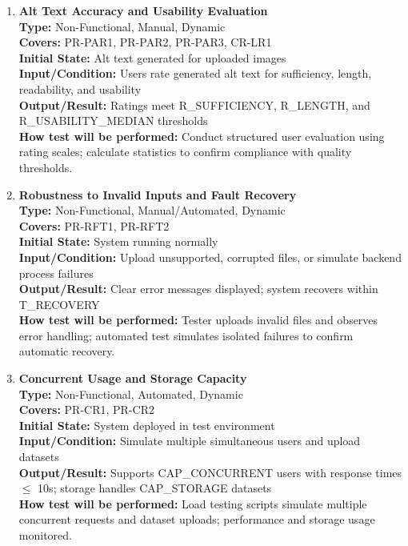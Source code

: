\documentclass[12pt, titlepage]{article}
\begin{document}
\begin{enumerate}[label=NFR-ST \arabic*., wide=0pt, leftmargin=*]
  \item \textbf{Alt Text Accuracy and Usability Evaluation} \\[2mm]
    \textbf{Type:} Non-Functional, Manual, Dynamic \\
    \textbf{Covers:} PR-PAR1, PR-PAR2, PR-PAR3, CR-LR1 \\
    \textbf{Initial State:} Alt text generated for uploaded images \\
    \textbf{Input/Condition:} Users rate generated alt text for
    sufficiency, length, readability, and usability \\
    \textbf{Output/Result:} Ratings meet R\_SUFFICIENCY, R\_LENGTH, and
    R\_USABILITY\_MEDIAN thresholds \\[2mm]
    \textbf{How test will be performed:} Conduct structured user
    evaluation using rating scales; calculate statistics to confirm
    compliance with quality thresholds.

  \item \textbf{Robustness to Invalid Inputs and Fault Recovery} \\[2mm]
    \textbf{Type:} Non-Functional, Manual/Automated, Dynamic \\
    \textbf{Covers:} PR-RFT1, PR-RFT2 \\
    \textbf{Initial State:} System running normally \\
    \textbf{Input/Condition:} Upload unsupported, corrupted files, or
    simulate backend process failures \\
    \textbf{Output/Result:} Clear error messages displayed; system
    recovers within T\_RECOVERY \\[2mm]
    \textbf{How test will be performed:} Tester uploads invalid files
    and observes error handling; automated test simulates isolated
    failures to confirm automatic recovery.

  \item \textbf{Concurrent Usage and Storage Capacity} \\[2mm]
    \textbf{Type:} Non-Functional, Automated, Dynamic \\
    \textbf{Covers:} PR-CR1, PR-CR2 \\
    \textbf{Initial State:} System deployed in test environment \\
    \textbf{Input/Condition:} Simulate multiple simultaneous users
    and upload datasets \\
    \textbf{Output/Result:} Supports CAP\_CONCURRENT users with
    response times $\le$ 10s; storage handles CAP\_STORAGE datasets \\[2mm]
    \textbf{How test will be performed:} Load testing scripts
    simulate multiple concurrent requests and dataset uploads;
    performance and storage usage monitored.


\end{enumerate}
\end{document}
